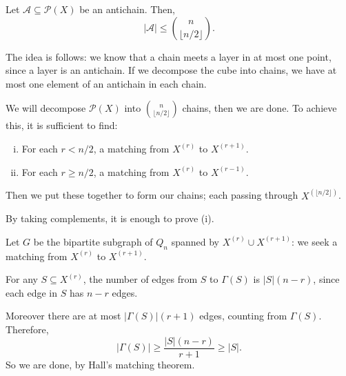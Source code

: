 \documentclass[12pt]{article}
\begin{document}

\begin{theorem}
	Let $\mathcal{A} \subseteq \mathcal{P}(X)$ be an antichain. Then,
	\[
		|\mathcal{A}| \leq \binom{n}{\lfloor n/2 \rfloor}.
	\]
\end{theorem}

The idea is follows: we know that a chain meets a layer in at most one point, since a layer is an antichain. If we decompose the cube into chains, we have at most one element of an antichain in each chain.

\begin{proofbox}
	We will decompose $\mathcal{P}(X)$ into $\binom n {\lfloor n/2 \rfloor}$ chains, then we are done. To achieve this, it is sufficient to find:
	\begin{enumerate}[(i)]
		\item For each $r < n/2$, a matching from $X^{(r)}$ to $X^{(r + 1)}$.
		\item For each $r \geq n/2$, a matching from $X^{(r)}$ to $X^{(r - 1)}$.
	\end{enumerate}
	Then we put these together to form our chains; each passing through $X^{(\lfloor n/2 \rfloor)}$.

	By taking complements, it is enough to prove (i).

	Let $G$ be the bipartite subgraph of $Q_n$ spanned by $X^{(r)} \cup X^{(r + 1)}$: we seek a matching from $X^{(r)}$ to $X^{(r + 1)}$.

	For any $S \subseteq X^{(r)}$, the number of edges from $S$ to $\Gamma(S)$ is $|S|(n - r)$, since each edge in $S$ has $n - r$ edges.

	Moreover there are at most $|\Gamma(S)|(r + 1)$ edges, counting from $\Gamma(S)$. Therefore,
	\[
	|\Gamma(S)| \geq \frac{|S|(n-r)}{r + 1} \geq |S|.
	\]
	So we are done, by Hall's matching theorem.
\end{proofbox}
\end{document}
